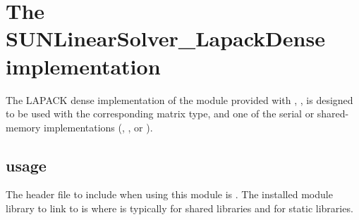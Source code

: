 \section{The SUNLinearSolver\_LapackDense implementation}\label{ss:sunlinsol_lapdense}

The LAPACK dense implementation of the {\sunlinsol} module provided
with {\sundials}, {\sunlinsollapdense}, is designed to be used with the 
corresponding {\sunmatdense} matrix type, and one of the serial or
shared-memory {\nvector} implementations ({\nvecs}, {\nvecopenmp}, or
{\nvecpthreads}).

\subsection{{\sunlinsollapdense} usage}\label{ss:sunlinsol_lapdense_usage}

The header file to include when using this module 
is . The installed module
library to link to is
where  is typically  for shared libraries and
 for static libraries.

